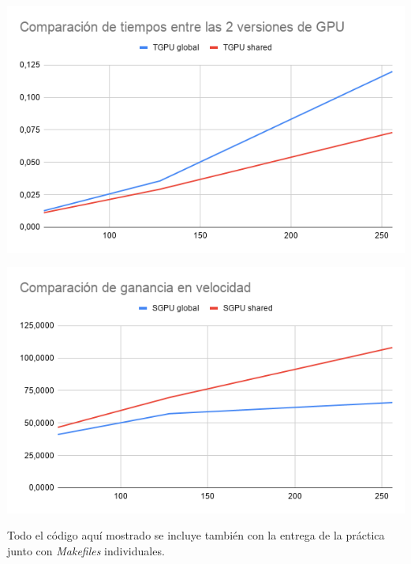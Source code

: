 \begin{center}
	\includegraphics[scale=0.5]{img/compt2}
\end{center}

\begin{center}
	\includegraphics[scale=0.5]{img/comps2}
\end{center}



Todo el código aquí mostrado se incluye también con la entrega de la práctica junto con \textit{Makefiles} individuales.

